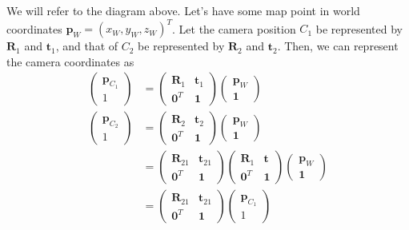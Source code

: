 \documentclass{article}
\begin{document}
  We will refer to the diagram above. Let's have some map point in world coordinates $\mathbf{p}_W = (x_W, y_W, z_W)^T$. Let the camera position $C_1$ be represented by $\mathbf{R}_1$ and $\mathbf{t}_1$, and that of $C_2$ be represented by $\mathbf{R}_2$ and $\mathbf{t}_2$. Then, we can represent the camera coordinates as 
  \begin{align*}
      \begin{pmatrix} \mathbf{p}_{C_1} \\ 1 \end{pmatrix} & = \begin{pmatrix} \mathbf{R}_1 & \mathbf{t}_1 \\ \mathbf{0}^T & \mathbf{1} \end{pmatrix} \begin{pmatrix} \mathbf{p}_W \\ \mathbf{1} \end{pmatrix} \\ 
      \begin{pmatrix} \mathbf{p}_{C_2} \\ 1 \end{pmatrix} & = \begin{pmatrix} \mathbf{R}_2 & \mathbf{t}_2 \\ \mathbf{0}^T & \mathbf{1} \end{pmatrix} \begin{pmatrix} \mathbf{p}_W \\ \mathbf{1} \end{pmatrix} \\
      & = \begin{pmatrix} \mathbf{R}_{21} & \mathbf{t}_{21} \\ \mathbf{0}^T & \mathbf{1} \end{pmatrix} \begin{pmatrix} \mathbf{R}_1 & \mathbf{t} \\ \mathbf{0}^T & \mathbf{1} \end{pmatrix} \begin{pmatrix} \mathbf{p}_W \\ \mathbf{1} \end{pmatrix} \\
      & = \begin{pmatrix} \mathbf{R}_{21} & \mathbf{t}_{21} \\ \mathbf{0}^T & \mathbf{1} \end{pmatrix} \begin{pmatrix} \mathbf{p}_{C_1} \\ 1 \end{pmatrix}
  \end{align*} 
\end{document}
